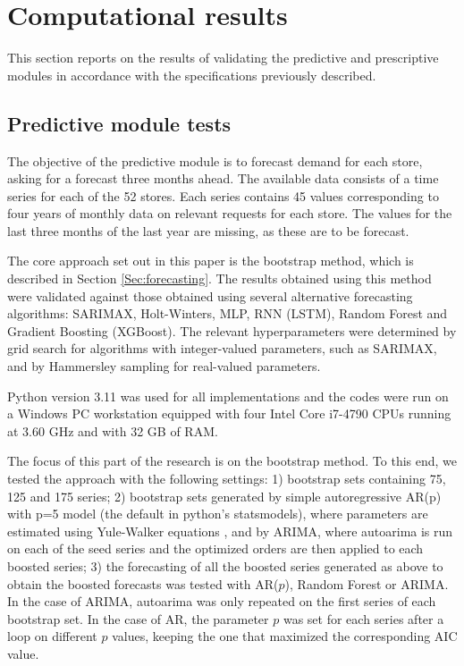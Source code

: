\documentclass[11pt]{article}
\begin{document}
\section{Computational results} \label{Sec:results}

This section reports on the results of validating the predictive and prescriptive modules in accordance with the specifications previously described.

\subsection{Predictive module tests}    \label{Subsec:predictive}

The objective of the predictive module is to forecast demand for each store, asking for a forecast three months ahead.
The available data consists of a time series for each of the 52 stores. Each series contains 45 values corresponding to four years of monthly data on relevant requests for each store. The values for the last three months of the last year are missing, as these are to be forecast.

The core approach set out in this paper is the bootstrap method, which is described in Section \ref{Sec:forecasting}. The results obtained using this method were validated against those obtained using several alternative forecasting algorithms: SARIMAX, Holt-Winters, MLP, RNN (LSTM), Random Forest and Gradient Boosting (XGBoost). The relevant hyperparameters were determined by grid search for algorithms with integer-valued parameters, such as SARIMAX, and by Hammersley sampling \citep{H60} for real-valued parameters.

Python version 3.11 was used for all implementations and the codes were run on a Windows PC workstation equipped with four Intel Core i7-4790 CPUs running at 3.60 GHz and with 32 GB of RAM.

The focus of this part of the research is on the bootstrap method. To this end, we tested the approach with the following settings: 
1) bootstrap sets containing 75, 125 and 175 series; 
2) bootstrap sets generated by simple autoregressive AR(p) with p=5 model (the default in python's statsmodels), where parameters are estimated using Yule-Walker equations \citep{BD91}, and by ARIMA, where autoarima is run on each of the seed series and the optimized orders are then applied to each boosted series; 
3) the forecasting of all the boosted series generated as above to obtain the boosted forecasts was tested with AR($p$), Random Forest or ARIMA. In the case of ARIMA, autoarima was only repeated on the first series of each bootstrap set. In the case of AR, the parameter $p$ was set for each series after a loop on different $p$ values, keeping the one that maximized the corresponding AIC value.
\end{document}
